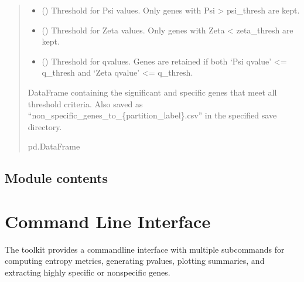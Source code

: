 \documentclass[letterpaper,10pt,english]{sphinxmanual}
\begin{document}
\begin{fulllineitems}
\begin{quote}
\begin{description}
\begin{itemize}
\item {} 
\sphinxAtStartPar
{} (\sphinxstyleliteralemphasis{\sphinxupquote{, }}) \textendash{} Threshold for Psi values. Only genes with Psi \textgreater{} psi\_thresh are kept.

\item {} 
\sphinxAtStartPar
{} (\sphinxstyleliteralemphasis{\sphinxupquote{, }}) \textendash{} Threshold for Zeta values. Only genes with Zeta \textless{} zeta\_thresh are kept.

\item {} 
\sphinxAtStartPar
{} (\sphinxstyleliteralemphasis{\sphinxupquote{, }}) \textendash{} Threshold for q\sphinxhyphen{}values. Genes are retained if both
‘Psi q\sphinxhyphen{}value’ \textless{}= q\_thresh and ‘Zeta q\sphinxhyphen{}value’ \textless{}= q\_thresh.

\end{itemize}

\sphinxAtStartPar
DataFrame containing the significant and specific genes that meet
all threshold criteria. Also saved as “non\_specific\_genes\_to\_\{partition\_label\}.csv”
in the specified save directory.

\sphinxAtStartPar
pd.DataFrame

\end{description}\end{quote}

\end{fulllineitems}



\section{Module contents}
\label{\detokenize{ember_py:module-ember_py}}\label{\detokenize{ember_py:module-contents}}
\sphinxstepscope


\chapter{Command Line Interface}
\label{\detokenize{cli:command-line-interface}}\label{\detokenize{cli::doc}}
\sphinxAtStartPar
The  toolkit provides a command\sphinxhyphen{}line interface with multiple
subcommands for computing entropy metrics, generating p\sphinxhyphen{}values, plotting
summaries, and extracting highly specific or non\sphinxhyphen{}specific genes.
\end{document}
